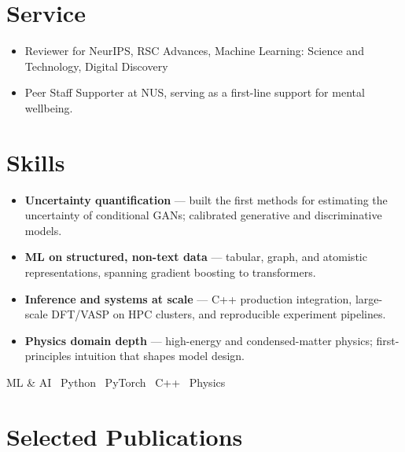 \documentclass[11pt,a4paper]{article}
\begin{document}
\section{Service}
\begin{itemize}
  \item Reviewer for NeurIPS, RSC Advances, Machine Learning: Science and Technology, Digital Discovery
  \item Peer Staff Supporter at NUS, serving as a first-line support for mental wellbeing.
\end{itemize}

\newpage

\section{Skills}
\begin{itemize}
  \item \textbf{Uncertainty quantification} --- built the first methods for estimating the uncertainty of conditional GANs; calibrated generative and discriminative models.
  \item \textbf{ML on structured, non-text data} --- tabular, graph, and atomistic representations, spanning gradient boosting to transformers.
  \item \textbf{Inference and systems at scale} --- C++ production integration, large-scale DFT/VASP on HPC clusters, and reproducible experiment pipelines.
  \item \textbf{Physics domain depth} --- high-energy and condensed-matter physics; first-principles intuition that shapes model design.
\end{itemize}
{\small\centering ML \& AI \textbullet\ Python \textbullet\ PyTorch \textbullet\ C++ \textbullet\ Physics\par}

\nocite{*}

\section{Selected Publications}
\printbibliography[filter=cvselected,heading=none,resetnumbers=true]
\end{document}
